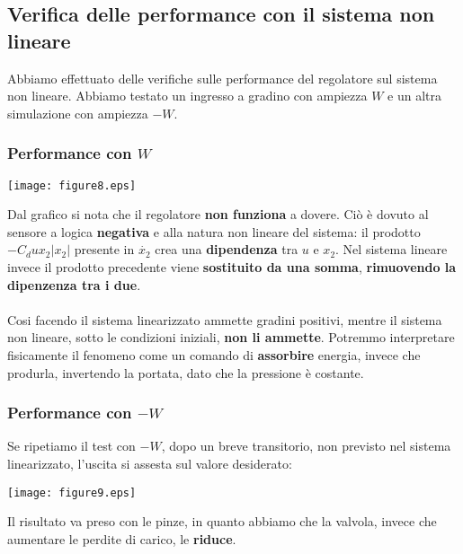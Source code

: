 \documentclass{article}
\begin{document}
\newpage

\subsection{Verifica delle performance con il sistema non lineare}
Abbiamo effettuato delle verifiche sulle performance del regolatore sul sistema non lineare. Abbiamo testato un ingresso a gradino con ampiezza $W$ e un altra simulazione con ampiezza $-W$.

\subsubsection{Performance con $W$}

\begin{center}
    \texttt{[image: figure8.eps]}
\end{center}

Dal grafico si nota che il regolatore \textbf{non funziona} a dovere. Ciò è dovuto al sensore a logica \textbf{negativa} e alla natura non lineare del sistema: il prodotto $-C_d u x_2 |x_2|$ presente in $\dot{x_2}$ crea una \textbf{dipendenza} tra $u$ e $x_2$. Nel sistema lineare invece il prodotto precedente viene \textbf{sostituito da una somma}, \textbf{rimuovendo la dipenzenza tra i due}.\\\\
Cosi facendo il sistema linearizzato ammette gradini positivi, mentre il sistema non lineare, sotto le condizioni iniziali, \textbf{non li ammette}. Potremmo interpretare fisicamente il fenomeno come un comando di \textbf{assorbire} energia, invece che produrla, invertendo la portata, dato che la pressione è costante.

\newpage

\subsubsection{Performance con $-W$}

Se ripetiamo il test con $-W$, dopo un breve transitorio, non previsto nel sistema linearizzato, l'uscita si assesta sul valore desiderato:

\begin{center}
    \texttt{[image: figure9.eps]}
\end{center}

Il risultato va preso con le pinze, in quanto abbiamo che la valvola, invece che aumentare le perdite di carico, le \textbf{riduce}.
\end{document}
